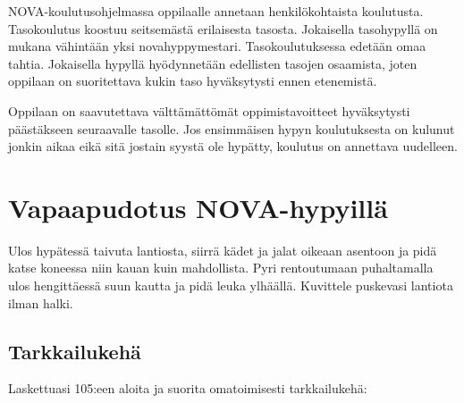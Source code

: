 
NOVA-koulutusohjelmassa oppilaalle annetaan henkilökohtaista koulutusta. Tasokoulutus koostuu seitsemästä erilaisesta tasosta. Jokaisella tasohypyllä on mukana vähintään yksi novahyppymestari. Tasokoulutuksessa edetään omaa tahtia. Jokaisella hypyllä hyödynnetään edellisten tasojen osaamista, joten oppilaan on suoritettava kukin taso hyväksytysti ennen etenemistä. 


Oppilaan on saavutettava välttämättömät oppimistavoitteet hyväksytysti päästäkseen seuraavalle tasolle. Jos ensimmäisen hypyn koulutuksesta on kulunut jonkin aikaa eikä sitä jostain syystä ole hypätty, koulutus on annettava uudelleen.  

\section{ Vapaapudotus NOVA-hypyillä }
\label{nova-alkeiskoulutuksen-suoritukset-vapaapudotus-nova-hypyilla}


Ulos hypätessä taivuta lantiosta, siirrä kädet ja jalat oikeaan asentoon ja pidä katse koneessa niin kauan kuin mahdollista. Pyri rentoutumaan puhaltamalla ulos hengittäessä suun kautta ja pidä leuka ylhäällä. Kuvittele puskevasi lantiota ilman halki. 

\subsection{Tarkkailukehä}
\label{nova-alkeiskoulutuksen-suoritukset-tarkkailukeha}


Laskettuasi 105:een aloita ja suorita omatoimisesti tarkkailukehä: 

